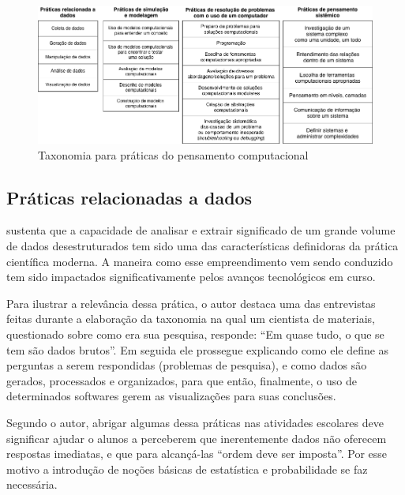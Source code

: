 \begin{landscape}
  \begin{center}
    \begin{figure}[!htb]
      \caption{Taxonomia para práticas do pensamento computacional}
      \begin{center}
          \includegraphics[scale=0.7]{imagens/taxonomia}
      \end{center}
      \label{fig:taxonomia}
    \end{figure}
  \end{center}
\end{landscape}

\subsection{Práticas relacionadas a dados}

 sustenta que a capacidade de analisar e extrair significado de um grande volume de dados desestruturados tem sido uma das características definidoras da prática científica moderna. A maneira como esse empreendimento vem sendo conduzido tem sido impactados significativamente pelos avanços tecnológicos em curso. 

Para ilustrar a relevância dessa prática, o autor destaca uma das entrevistas feitas durante a elaboração da taxonomia na qual um cientista de materiais, questionado sobre como era sua pesquisa, responde: ``Em quase tudo, o que se tem são dados brutos''. Em seguida ele prossegue explicando como ele define as perguntas a serem respondidas (problemas de pesquisa), e como dados são gerados, processados e organizados, para que então, finalmente, o uso de determinados softwares gerem as visualizações para suas conclusões. 


Segundo o autor, abrigar algumas dessa práticas nas atividades escolares deve significar ajudar o alunos a perceberem que inerentemente dados não oferecem respostas imediatas, e que para alcançá-las ``ordem deve ser imposta''. Por esse motivo a introdução de noções básicas de estatística e probabilidade se faz necessária.


